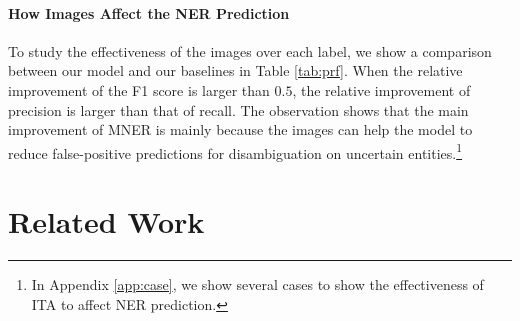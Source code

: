 \documentclass[11pt]{article}
\begin{document}
\paragraph{How Images Affect the NER Prediction}
To study the effectiveness of the images over each label, we show a comparison between our model and our baselines in Table \ref{tab:prf}. When the relative improvement of the F1 score is larger than $0.5$, the relative improvement of precision is larger than that of recall. The observation shows that the main improvement of MNER is mainly because the images can help the model to reduce false-positive predictions for disambiguation on uncertain entities.\footnote{In Appendix \ref{app:case}, we show several cases to show the effectiveness of ITA to affect NER prediction.}








\section{Related Work}
\end{document}

